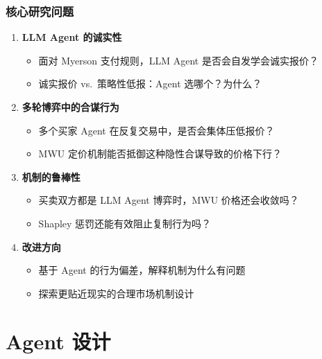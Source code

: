 \documentclass[10pt,aspectratio=169]{beamer}
\begin{document}
\begin{frame}
	\frametitle{核心研究问题}

	\begin{enumerate}
		\item \textbf{LLM Agent 的诚实性}
		      \begin{itemize}
			      \item 面对 Myerson 支付规则，LLM Agent 是否会自发学会诚实报价？
			      \item 诚实报价 vs.\ 策略性低报：Agent 选哪个？为什么？
		      \end{itemize}

		\pause
		\item \textbf{多轮博弈中的合谋行为}
		      \begin{itemize}
			      \item 多个买家 Agent 在反复交易中，是否会集体压低报价？
			      \item MWU 定价机制能否抵御这种隐性合谋导致的价格下行？
		      \end{itemize}

		\pause
		\item \textbf{机制的鲁棒性}
		      \begin{itemize}
			      \item 买卖双方都是 LLM Agent 博弈时，MWU 价格还会收敛吗？
			      \item Shapley 惩罚还能有效阻止复制行为吗？
		      \end{itemize}

		\pause
		\item \textbf{改进方向}
		      \begin{itemize}
			      \item 基于 Agent 的行为偏差，解释机制为什么有问题
			      \item 探索更贴近现实的合理市场机制设计
		      \end{itemize}
	\end{enumerate}
\end{frame}

\section{Agent 设计}
\end{document}
